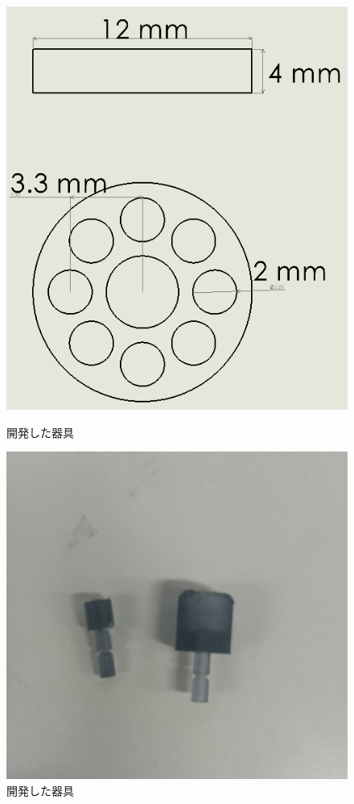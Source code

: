 \begin{figure}[b]
  \centering
  \begin{minipage}{0.49\hsize}
      \centering
      \includegraphics[scale=0.25]{pic/setu.PNG}
      \caption{開発した器具}
      \label{fig:setu}
  \end{minipage} \hfill
  \begin{minipage}{0.49\hsize}
      \centering
      \includegraphics[scale=0.25]{pic/S__157270018.jpg}
      \caption{開発した器具}
      \label{fig:kuro}
  \end{minipage} 
\end{figure}
